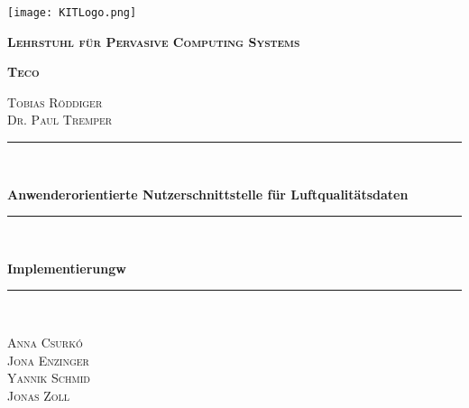 \begin{titlepage}
    \centering
    \texttt{[image: KITLogo.png]}\par\vspace{1cm}
        {\scshape \bfseries Lehrstuhl für Pervasive Computing Systems\par}
        {\scshape \bfseries Teco\par}
        \vspace{0.25cm}
        {\scshape Tobias Röddiger\\Dr. Paul Tremper\par}
        \vspace{1.5cm}
  
      \newcommand{\HRule}{\rule{\linewidth}{0.5mm}}
      {\color{mintgreen}\HRule} \\[0.4cm]
        {\huge \bfseries \LARGE Anwenderorientierte Nutzerschnittstelle für Luftqualitätsdaten\par}
        {\color{mintgreen}\HRule} \\[0.4cm]
        {
            \huge \bfseries \LARGE Implementierungw \par
        }
        {\color{mintgreen}\HRule} \\[1cm]
        \vspace{2cm}
        {\scshape \Large Anna Csurkó\\Jona Enzinger\\Yannik Schmid\\Jonas Zoll\par}
        \vfill
  
  \end{titlepage}
  